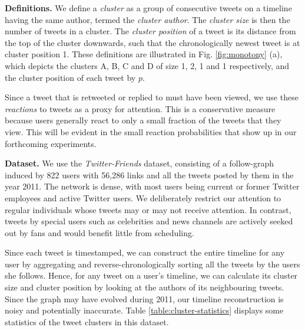 \documentclass[onesided,letterpaper]{tufte-book}
\begin{document}
\textbf{Definitions.} We define a \textit{cluster} as a group of consecutive tweets on a timeline having the same author, termed the \textit{cluster author}. The \textit{cluster size} is then the number of tweets in a cluster. The \textit{cluster position} of a tweet is its distance from the top of the cluster downwards, such that the chronologically newest tweet is at cluster position 1. These definitions are illustrated in Fig. \ref{fig:monotony} (a), which depicts the clusters A, B, C and D of size 1, 2, 1 and 1 respectively, and the cluster position of each tweet by $p$.

Since a tweet that is retweeted or replied to must have been viewed, we use these \textit{reactions} to tweets as a proxy for attention. This is a conservative measure because users generally react to only a small fraction of the tweets that they view. This will be evident in the small reaction probabilities that show up in our forthcoming experiments.

\textbf{Dataset.} We use the \textit{Twitter-Friends} dataset\cite{lin2014steering}, consisting of a follow-graph induced by 822 users with 56,286 links and all the tweets posted by them in the year 2011. The network is dense, with most users being current or former Twitter employees and active Twitter users. We deliberately restrict our attention to regular individuals whose tweets may or may not receive attention. In contrast, tweets by special users such as celebrities and news channels are actively seeked out by fans and would benefit little from scheduling.

Since each tweet is timestamped, we can construct the entire timeline for any user by aggregating and reverse-chronologically  sorting all the tweets by the users she follows. Hence, for any tweet on a user's timeline, we can calculate its cluster size and cluster position by looking at the authors of its neighbouring tweets. Since the graph may have evolved during 2011, our timeline reconstruction is noisy and potentially inaccurate. Table \ref{table:cluster-statistics} displays some statistics of the tweet clusters in this dataset.
\end{document}
